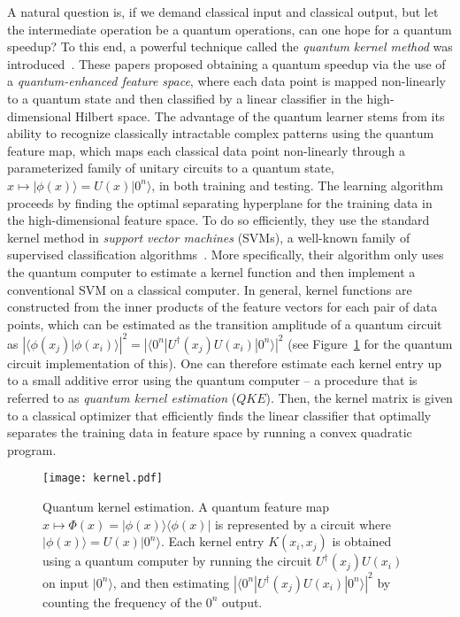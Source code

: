 \documentclass[11pt]{article}
\newcommand{\ket}[1]{|#1\rangle}
\newcommand{\ketbra}[2]{|#1\rangle\langle#2|}
\newcommand{\braketIP}[2]{\langle{#1}|{#2}\rangle}
\newcommand{\snote}[1]{\footnote{\textcolor{magenta}{(Srini: #1)}}}
\begin{document}
A natural question is, if we demand classical input and classical output, but let the intermediate operation be a quantum operations, can one hope for a quantum speedup? To this end, a powerful technique called the \emph{quantum kernel method} was introduced~\cite{Havlicek2019,Schuld2019quantum}. These papers proposed obtaining a quantum speedup via the use of a \emph{quantum-enhanced feature space}, where each data point is mapped non-linearly to a quantum state and then classified by a linear classifier in the high-dimensional Hilbert space.  The advantage of the quantum learner stems from its ability to recognize classically intractable complex patterns using the quantum feature map, which maps each classical data point non-linearly through a parameterized family of unitary circuits to a quantum state, $x\mapsto \ket{\phi(x)}=U(x)\ket{0^n}$, in both training and testing. The learning  algorithm proceeds by finding the optimal separating hyperplane for the training data in the high-dimensional feature space. To do so efficiently, they use the standard kernel method in \emph{support vector machines} (SVMs), a well-known family of supervised classification algorithms~\cite{vapnik2013nature}. More specifically, their algorithm only uses the quantum computer to estimate a kernel function and then implement a conventional SVM on a classical computer. In general, kernel functions are constructed from the inner products of the feature vectors for each pair of data points, which can be estimated as the transition amplitude of a quantum circuit as $\left|\braketIP{\phi(x_j)}{\phi(x_i)}\right|^2=|\langle 0^n|U^\dag (x_j)U(x_i)|0^n \rangle |^2$ (see Figure~\ref{fig:kernel} for the quantum circuit implementation of this). One can therefore estimate each kernel entry up to  a small additive error using the quantum computer -- a procedure that is referred to as \emph{quantum kernel estimation} ($QKE$). Then, the kernel matrix is given to a classical optimizer that efficiently finds the linear classifier that optimally separates the training data in feature space by running a convex quadratic program.  

\begin{figure}[t]
    \centering
    \texttt{[image: kernel.pdf]}
    \caption{Quantum kernel estimation. A quantum feature map $x\mapsto \Phi(x) = \ketbra{\phi(x)}{\phi(x)}$ is represented by a circuit where $\ket{\phi(x)}=U(x)\ket{0^n}$. Each kernel entry $K(x_i,x_j)$ is obtained using a quantum computer by running the circuit $U^\dag (x_j)U(x_i)$ on input $\ket{0^n}$, and then estimating $\left|\langle 0^n|{U^\dag (x_j)U(x_i)}|{0^n}\rangle \right|^2$ by counting the frequency of the $0^n$ output.}
    \label{fig:kernel}
\end{figure}
\end{document}
